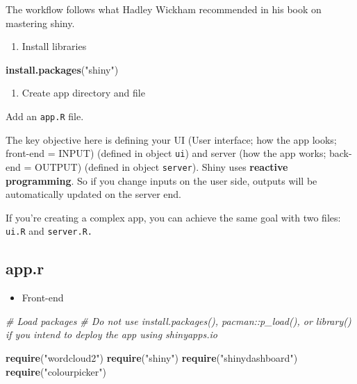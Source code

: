 \documentclass[
]{book}
\newenvironment{Shaded}{\begin{snugshade}}{\end{snugshade}}
\newcommand{\CommentTok}[1]{\textcolor[rgb]{0.56,0.35,0.01}{\textit{#1}}}
\newcommand{\KeywordTok}[1]{\textcolor[rgb]{0.13,0.29,0.53}{\textbf{#1}}}
\newcommand{\NormalTok}[1]{#1}
\newcommand{\StringTok}[1]{\textcolor[rgb]{0.31,0.60,0.02}{#1}}
\providecommand{\tightlist}{%
  \setlength{\itemsep}{0pt}\setlength{\parskip}{0pt}}
\begin{document}
The workflow follows what Hadley Wickham recommended in his book on mastering shiny.

\begin{enumerate}
\def\labelenumi{\arabic{enumi}.}
\tightlist
\item
  Install libraries
\end{enumerate}

\begin{Shaded}
\begin{Highlighting}[]
\KeywordTok{install.packages}\NormalTok{(}\StringTok{"shiny"}\NormalTok{)}
\end{Highlighting}
\end{Shaded}

\begin{enumerate}
\def\labelenumi{\arabic{enumi}.}
\setcounter{enumi}{1}
\tightlist
\item
  Create app directory and file
\end{enumerate}

Add an \texttt{app.R} file.

The key objective here is defining your UI (User interface; how the app looks; front-end = INPUT) (defined in object \texttt{ui}) and server (how the app works; back-end = OUTPUT) (defined in object \texttt{server}). Shiny uses \textbf{reactive programming}. So if you change inputs on the user side, outputs will be automatically updated on the server end.

If you're creating a complex app, you can achieve the same goal with two files: \texttt{ui.R} and \texttt{server.R.}

\hypertarget{app.r}{%
\subsection{app.r}\label{app.r}}

\begin{itemize}
\tightlist
\item
  Front-end
\end{itemize}

\begin{Shaded}
\begin{Highlighting}[]
\CommentTok{\# Load packages }
\CommentTok{\# Do not use install.packages(), pacman::p\_load(), or library() if you intend to deploy the app using shinyapps.io }

\KeywordTok{require}\NormalTok{(}\StringTok{"wordcloud2"}\NormalTok{)}
\KeywordTok{require}\NormalTok{(}\StringTok{"shiny"}\NormalTok{)}
\KeywordTok{require}\NormalTok{(}\StringTok{"shinydashboard"}\NormalTok{)}
\KeywordTok{require}\NormalTok{(}\StringTok{"colourpicker"}\NormalTok{)}
\end{Highlighting}
\end{Shaded}
\end{document}
